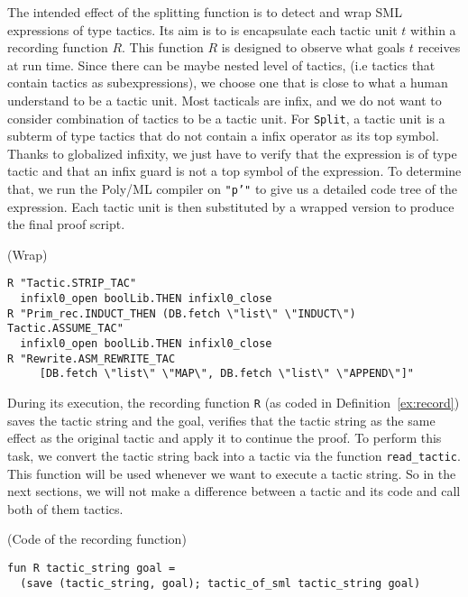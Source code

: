 \documentclass[runningheads,a4paper,draft]{svjour3}
\def\sml{\textsf{SML}\xspace}
\def\polyml{\textsf{Poly/ML}\xspace}
\begin{document}
The intended effect of the splitting function is to detect and wrap \sml 
expressions of type tactics. Its aim is to is encapsulate each tactic 
unit $t$ within a recording function $R$. This function $R$ is designed to 
observe what goals $t$ receives at run time. Since there can be maybe nested 
level of tactics, (i.e 
tactics that contain tactics as subexpressions), we choose one that is
close to what a human understand to be a tactic unit. 
Most tacticals are infix, and we do not want to consider combination of 
tactics to be a tactic unit. For \texttt{Split}, a tactic unit is a 
subterm of 
type tactics that do not contain a infix operator as its top symbol. Thanks to
globalized infixity, we just have to verify that the expression 
is of type tactic and that an infix guard is not a top symbol of the expression.
To determine that, we run the \polyml compiler on \texttt{"p'"} to give us a 
detailed code tree of the expression. Each tactic unit is then substituted 
by a wrapped version to produce the final proof script.

\begin{example} (Wrap)
\begin{lstlisting}[language=SMLSmall,frame=tb]
R "Tactic.STRIP_TAC"
  infixl0_open boolLib.THEN infixl0_close
R "Prim_rec.INDUCT_THEN (DB.fetch \"list\" \"INDUCT\") Tactic.ASSUME_TAC"
  infixl0_open boolLib.THEN infixl0_close
R "Rewrite.ASM_REWRITE_TAC 
     [DB.fetch \"list\" \"MAP\", DB.fetch \"list\" \"APPEND\"]"
\end{lstlisting}
\end{example}   

During its execution, the recording function \texttt{R} (as coded in 
Definition~\ref{ex:record}) 
saves the tactic 
string and the goal, verifies that the tactic string as the same effect as the 
original tactic and apply it to continue the proof. To perform this task, we 
convert the tactic string back into a tactic via the function 
\texttt{read\_tactic}. This function will be used whenever we want to execute a 
tactic string. So in the next sections, we will not make a difference between a 
tactic and its code and call both of them tactics.


\begin{example}\label{ex:record} (Code of the recording function)
\begin{lstlisting}[language=SMLSmall,frame=tb]
fun R tactic_string goal = 
  (save (tactic_string, goal); tactic_of_sml tactic_string goal)
\end{lstlisting}
\end{example} 
\end{document}
